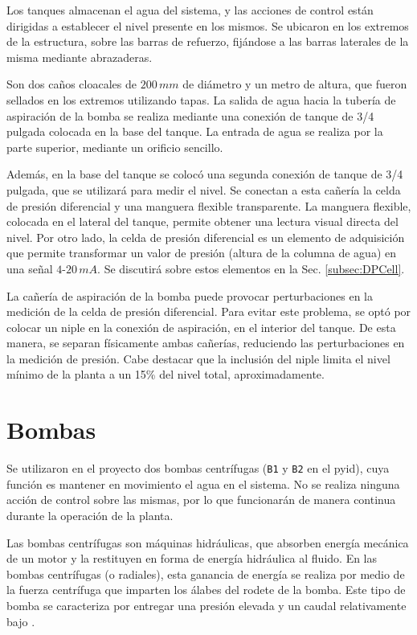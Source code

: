 Los tanques almacenan el agua del sistema, y las acciones de
control están dirigidas a establecer el nivel presente en los mismos.
Se ubicaron en los extremos de la estructura, sobre las barras de 
refuerzo, fijándose a las barras laterales de la misma mediante
abrazaderas.

Son dos caños cloacales de $200\,mm$ de diámetro y un metro de altura, que
fueron sellados en los extremos utilizando tapas.
La salida de agua hacia la tubería de aspiración de la bomba se realiza
mediante una conexión de tanque de 3/4 pulgada colocada en la base del tanque.
La entrada de agua se realiza por la parte superior, mediante un orificio
sencillo.

Además, en la base del tanque se colocó una segunda conexión de tanque de 3/4
pulgada, que se utilizará para medir el nivel.
Se conectan a esta cañería la celda de presión diferencial y una manguera
flexible transparente.
La manguera flexible, colocada en el lateral del tanque, permite obtener una
lectura visual directa del nivel.
Por otro lado, la celda de presión diferencial es un elemento de adquisición
que permite transformar un valor de presión (altura de la columna de agua) en
una señal $4$-$20\,mA$.
Se discutirá sobre estos elementos en la Sec. \ref{subsec:DPCell}.

La cañería de aspiración de la bomba puede provocar
perturbaciones en la medición de la celda de presión diferencial.
Para evitar este problema, se optó por
colocar un niple en la conexión de aspiración, en el interior del tanque.
De esta manera, se separan físicamente ambas cañerías, reduciendo las
perturbaciones en la medición de presión.
Cabe destacar que la inclusión del niple limita el nivel mínimo de la planta a
un 15\% del nivel total, aproximadamente.

\section{Bombas}
\label{sec:Bombas}

Se utilizaron en el proyecto dos bombas centrífugas (\verb|B1| y \verb|B2| en
el \gls{pyid}), cuya función es
mantener en movimiento el agua en el sistema.
No se realiza ninguna acción de control sobre las
mismas, por lo que funcionarán de manera continua durante la operación de la
planta.

Las bombas centrífugas son máquinas hidráulicas, que absorben energía mecánica
de un motor y la restituyen en forma de energía hidráulica al fluido.
En las bombas centrífugas (o radiales), esta ganancia de energía se realiza por
medio de la fuerza centrífuga que imparten los álabes del rodete de la bomba.
Este tipo de bomba se caracteriza por entregar una presión elevada y un caudal
relativamente bajo \cite{bib:Mataix}.

